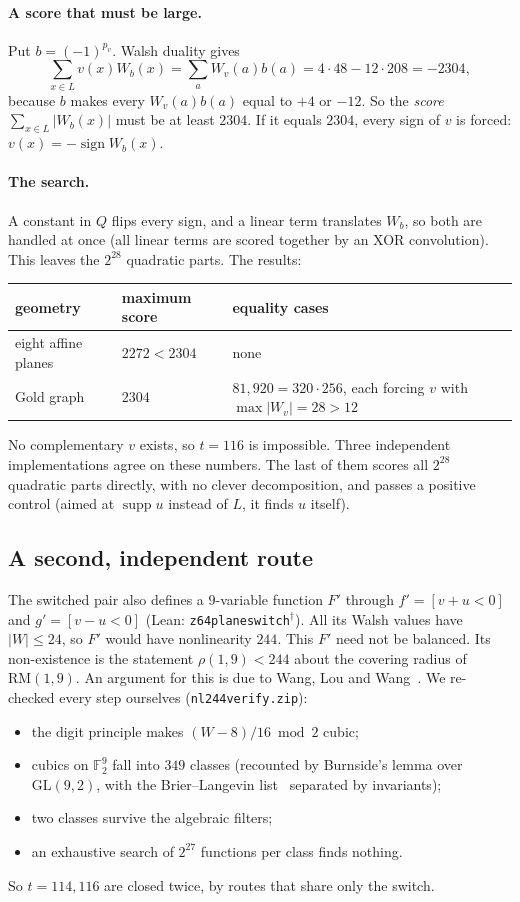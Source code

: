\documentclass[11pt]{article}
\theoremstyle{definition}
\theoremstyle{remark}
\newcommand{\F}{\mathbb{F}}
\newcommand{\supp}{\operatorname{supp}}
\newcommand{\code}[1]{\texttt{#1}}
\DeclareRobustCommand{\_}{\textunderscore\allowbreak}
\begin{document}
\paragraph{A score that must be large.} Put $b=(-1)^{p_v}$. Walsh duality gives
\[
  \sum_{x\in L}v(x)W_b(x)=\sum_aW_v(a)b(a)=4\cdot48-12\cdot208=-2304 ,
\]
because $b$ makes every $W_v(a)b(a)$ equal to $+4$ or $-12$. So the \emph{score} $\sum_{x\in L}|W_b(x)|$ must be at least $2304$. If it equals $2304$, every sign of $v$ is forced: $v(x)=-\operatorname{sign}W_b(x)$.

\paragraph{The search.} A constant in $Q$ flips every sign, and a linear term translates $W_b$, so both are handled at once (all linear terms are scored together by an XOR convolution). This leaves the $2^{28}$ quadratic parts. The results:
\begin{center}
\begin{tabular}{@{}lll@{}}
\toprule
geometry & maximum score & equality cases\\
\midrule
eight affine planes & $2272<2304$ & none\\
Gold graph & $2304$ & $81{,}920=320\cdot256$, each forcing $v$ with $\max|W_v|=28>12$\\
\bottomrule
\end{tabular}
\end{center}
No complementary $v$ exists, so $t=116$ is impossible. Three independent implementations agree on these numbers. The last of them scores all $2^{28}$ quadratic parts directly, with no clever decomposition, and passes a positive control (aimed at $\supp u$ instead of $L$, it finds $u$ itself).

\subsection{A second, independent route}\label{sec:route2}
The switched pair also defines a $9$-variable function $F'$ through $f'=[v+u<0]$ and $g'=[v-u<0]$ (Lean: \code{z64\_plane\_switch\_114\_116}$^\dagger$). All its Walsh values have $|W|\le24$, so $F'$ would have nonlinearity $244$. This $F'$ need not be balanced. Its non-existence is the statement $\rho(1,9)<244$ about the covering radius of $\mathrm{RM}(1,9)$. An argument for this is due to Wang, Lou and Wang~\cite{WLW2026}. We re-checked every step ourselves (\code{nl244\_verify.zip}):
\begin{itemize}[nosep]
  \item the digit principle makes $(W-8)/16\bmod2$ cubic;
  \item cubics on $\F_2^9$ fall into $349$ classes (recounted by Burnside's lemma over $\mathrm{GL}(9,2)$, with the Brier--Langevin list~\cite{BL2003} separated by invariants);
  \item two classes survive the algebraic filters;
  \item an exhaustive search of $2^{27}$ functions per class finds nothing.
\end{itemize}
So $t=114,116$ are closed twice, by routes that share only the switch.
\end{document}
